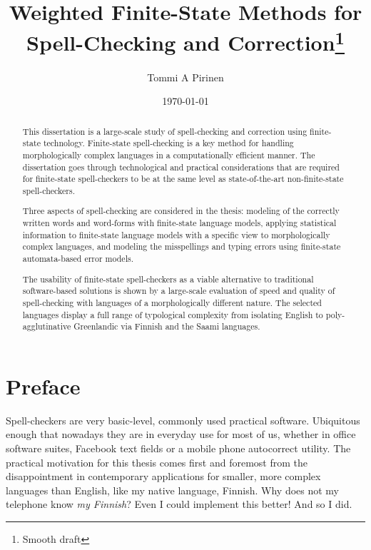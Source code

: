 \documentclass[officiallayout]{unihelcompling}
\title{Weighted Finite-State Methods for 
Spell-Checking
and Correction\footnote{Smooth draft}}
\author{Tommi A Pirinen}
\date{\today}
\begin{document}
\frontmatter

\maketitle

\begin{abstract} 
    This dissertation is a large-scale study of spell-checking and correction
    using finite-state technology. Finite-state spell-checking is a key method
    for handling morphologically complex languages in a computationally
    efficient manner. The dissertation goes through technological and practical
    considerations that are required for finite-state spell-checkers to be at
    the same level as state-of-the-art non-finite-state spell-checkers. 

    Three aspects of spell-checking are considered in the thesis: modeling of
    the correctly written words and word-forms with finite-state language
    models, applying statistical information to finite-state language models
    with a specific view to morphologically complex languages, and modeling the
    misspellings and typing errors using finite-state automata-based error
    models.

    The usability of finite-state spell-checkers as a viable alternative to
    traditional software-based solutions is shown by a large-scale
    evaluation of speed and quality of spell-checking with languages of
    a morphologically different nature. The selected languages display a
    full range of typological complexity from isolating English to 
    poly-agglutinative Greenlandic via Finnish and the Saami languages.
\end{abstract}

\mainmatter

\chapter*{Preface}
\label{chap:preface}

Spell-checkers are very basic-level, commonly used practical software.
Ubi\-quitous enough that nowadays they are in everyday use for most of us,
whether in office software suites, Facebook text fields or a mobile
phone autocorrect utility. The practical motivation for this thesis comes
first and foremost from the disappointment in contemporary applications for
smaller, more complex languages than English, like my native language, Finnish.
Why does not my telephone know \emph{my Finnish}? Even I could implement this
better! And so I did.
\end{document}
